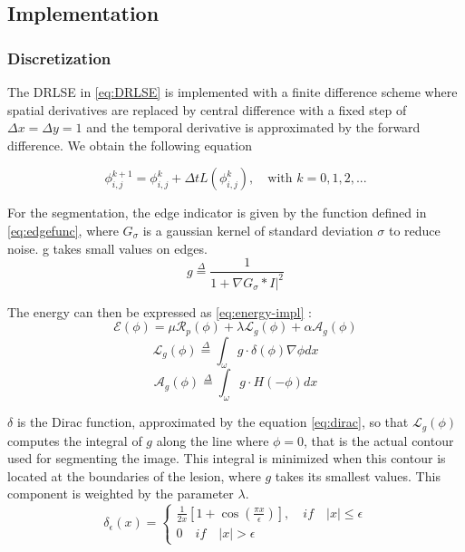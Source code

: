 \documentclass[a4paper,10pt]{article}
\begin{document}
\subsection{Implementation}
\subsubsection*{Discretization}

The DRLSE in \ref{eq:DRLSE} is implemented with a finite difference scheme where spatial derivatives are replaced by central difference with a fixed step of $\Delta x = \Delta y = 1$ and the temporal derivative is approximated by the forward difference. We obtain the following equation 

\begin{equation}
\phi_{i,j}^{k+1}=\phi_{i,j}^k + \Delta t L(\phi_{i,j}^k), \quad \text{with } k=0,1,2,... 
\end{equation}

For the segmentation, the edge indicator is  given by the function defined in \ref{eq:edgefunc}, where $G_\sigma$ is a gaussian kernel of standard deviation $\sigma$ to reduce noise. g takes small values on edges.
\begin{equation}
g \stackrel{\Delta}{=}\frac{1}{1+\nabla G_\sigma \ast I|^2}
\label{eq:edgefunc}
\end{equation}

The energy can then be expressed as \ref{eq:energy-impl} :
\begin{equation}
\mathcal{E}(\phi)= \mu\mathcal{R}_p(\phi) + \lambda \mathcal{L}_g(\phi) + \alpha\mathcal{A}_g(\phi)
\label{eq:energy-impl}
\end{equation}
$$\mathcal{L}_g(\phi) \stackrel{\Delta}{=}\int_{\omega}g\cdot\delta (\phi)\nabla\phi dx $$
$$\mathcal{A}_g(\phi)\stackrel{\Delta}{=}\int_{\omega}g\cdot H(-\phi)dx$$

$\delta$ is the Dirac function, approximated by the equation \ref{eq:dirac}, so that $\mathcal{L}_g(\phi)$ computes the integral of $g$ along the line where $\phi = 0$, that is the actual contour used for segmenting the image. This integral is minimized when this contour is located at the boundaries of the lesion, where $g$ takes its smallest values. This component is weighted by the parameter $\lambda$.
\begin{equation}
\delta_\epsilon(x)= 
\begin{cases}
\frac{1}{2x}[1+\cos(\frac{\pi x}{\epsilon})], \quad if \quad |x| \leq \epsilon \\
0 \quad if \quad |x| > \epsilon 
\end{cases}
\label{eq:dirac}
\end{equation}
\end{document}
